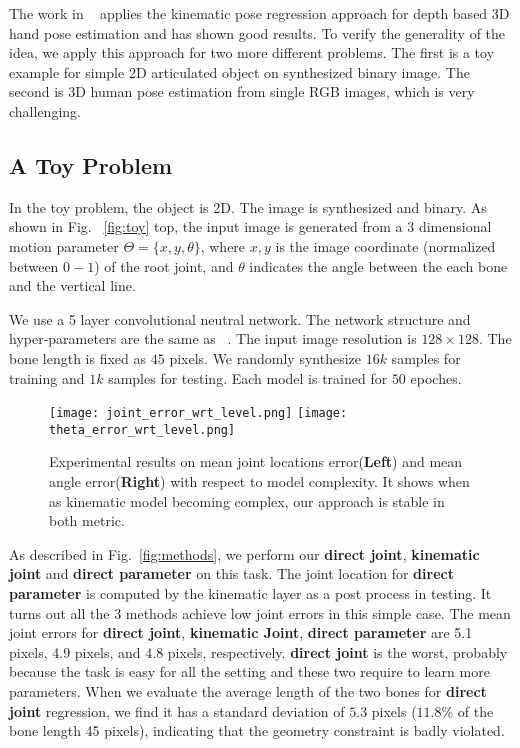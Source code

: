 \documentclass[runningheads]{llncs}
\begin{document}
The work in ~\cite{zhou2016model} applies the kinematic pose regression approach for depth based 3D hand pose estimation and has shown good results. To verify the generality of the idea, we apply this approach for two more different problems. The first is a toy example for simple 2D articulated object on synthesized binary image. The second is 3D human pose estimation from single RGB images, which is very challenging.

\subsection{A Toy Problem}



In the toy problem, the object is 2D. The image is synthesized and binary. As shown in Fig. ~\ref{fig:toy} top, the input image is generated from a 3 dimensional motion parameter $\Theta = \{x, y, \theta\}$, where $x, y$ is the image coordinate (normalized between $0 - 1$) of the root joint, and $\theta$ indicates the angle between the each bone and the vertical line.

We use a 5 layer convolutional neutral network. The network structure and hyper-parameters are the same as ~\cite{zhou2016model}. The input image resolution is $128 \times 128$. The bone length is fixed as $45$ pixels. We randomly synthesize $16k$ samples for training and $1k$ samples for testing. Each model is trained for $50$ epoches.

\begin{figure}
\begin{center}
\texttt{[image: joint\_error\_wrt\_level.png]}
\texttt{[image: theta\_error\_wrt\_level.png]}
\end{center}
   \caption{Experimental results on mean joint locations error(\textbf{Left}) and mean angle error(\textbf{Right}) with respect to model complexity. It shows when as kinematic model becoming complex, our approach is stable in both metric.}
\label{fig:toycomp}
\end{figure}

As described in Fig.~\ref{fig:methods}, we perform our \textbf{direct joint}, \textbf{kinematic joint} and \textbf{direct parameter} on this task. The joint location for \textbf{direct parameter} is computed by the kinematic layer as a post process in testing. It turns out all the 3 methods achieve low joint errors in this simple case. The mean joint errors for \textbf{direct joint}, \textbf{kinematic Joint}, \textbf{direct parameter} are 5.1 pixels, 4.9 pixels, and 4.8 pixels, respectively.
\textbf{direct joint} is the worst, probably because the task is easy for all the setting and these two require to learn more parameters. When we evaluate the average length of the two bones for \textbf{direct joint} regression, we find it has a standard deviation of $5.3$ pixels ($11.8\%$ of the bone length 45 pixels), indicating that the geometry constraint is badly violated.
\end{document}
